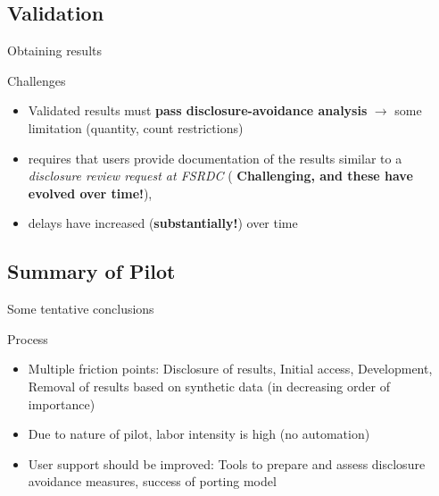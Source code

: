 \subsection{Validation}


\begin{frame}{Obtaining results}
\scalebox{0.1}{\myworkflow}
\scalebox{0.6}{
	\obtainingresults{}
}

\begin{block}{Challenges}
\begin{itemize}
	\item Validated results must \textbf{\color{orange}pass disclosure-avoidance analysis} $\rightarrow$ some limitation (quantity, count restrictions) 
	\item requires that 	users provide  documentation of the results similar to a {\it \color{orange}	disclosure review request at \ac{FSRDC}} ({\bf \color{orange} Challenging, and these have evolved over time!}), 
	\item delays have increased ({\bf \color{orange}substantially!}) over time
	\end{itemize}
\end{block}
\end{frame}





\subsection{Summary of Pilot}
\label{sec:pilot:summary}

\begin{frame}{Some tentative conclusions}
\scalebox{0.1}{\myworkflow{}}
\begin{block}{Process}
\begin{itemize}
    \item Multiple friction points: Disclosure of results, Initial access, Development, Removal of results based on synthetic data (in decreasing order of importance)
    \item Due to nature of pilot, labor intensity is high (no automation)
    \item User support should be improved: Tools to prepare and assess disclosure avoidance measures, success of porting model
\end{itemize}
\end{block} 
\end{frame}



